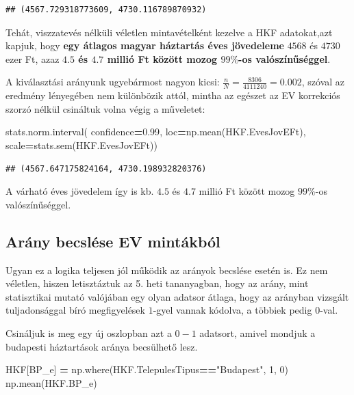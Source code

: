 \documentclass[
]{book}
\newenvironment{Shaded}{\begin{snugshade}}{\end{snugshade}}
\newcommand{\DecValTok}[1]{\textcolor[rgb]{0.00,0.00,0.81}{#1}}
\newcommand{\FloatTok}[1]{\textcolor[rgb]{0.00,0.00,0.81}{#1}}
\newcommand{\NormalTok}[1]{#1}
\newcommand{\OperatorTok}[1]{\textcolor[rgb]{0.81,0.36,0.00}{\textbf{#1}}}
\newcommand{\StringTok}[1]{\textcolor[rgb]{0.31,0.60,0.02}{#1}}
\begin{document}
\begin{verbatim}
## (4567.729318773609, 4730.116789870932)
\end{verbatim}

Tehát, viszzatevés nélküli véletlen mintavételként kezelve a HKF adatokat,azt kapjuk, hogy \textbf{egy átlagos magyar háztartás éves jövedeleme} \(4568\) és \(4730\) ezer Ft, azaz \textbf{\(4.5\) és \(4.7\) millió Ft között mozog \(99\%\)-os valószínűséggel}.

A kiválasztási arányunk ugyebármost nagyon kicsi: \(\frac{n}{N}=\frac{8306}{4111240}=0.002\), szóval az eredmény lényegében nem különbözik attól, mintha az egészet az EV korrekciós szorzó nélkül csináltuk volna végig a műveletet:

\begin{Shaded}
\begin{Highlighting}[]
\NormalTok{stats.norm.interval(}
\NormalTok{  confidence}\OperatorTok{=}\FloatTok{0.99}\NormalTok{,}
\NormalTok{  loc}\OperatorTok{=}\NormalTok{np.mean(HKF.EvesJovEFt),}
\NormalTok{  scale}\OperatorTok{=}\NormalTok{stats.sem(HKF.EvesJovEFt))}
\end{Highlighting}
\end{Shaded}

\begin{verbatim}
## (4567.647175824164, 4730.198932820376)
\end{verbatim}

A várható éves jövedelem így is kb. \(4.5\) és \(4.7\) millió Ft között mozog \(99\%\)-os valószínűséggel.

\subsection{Arány becslése EV mintákból}\label{aruxe1ny-becsluxe9se-ev-mintuxe1kbuxf3l}

Ugyan ez a logika teljesen jól működik az arányok becslése esetén is. Ez nem véletlen, hiszen letisztáztuk az 5. heti tananyagban, hogy az arány, mint statisztikai mutató valójában egy olyan adatsor átlaga, hogy az arányban vizsgált tuljadonsággal bíró megfigyelések \(1\)-gyel vannak kódolva, a többiek pedig \(0\)-val.

Csináljuk is meg egy új oszlopban azt a \(0-1\) adatsort, amivel mondjuk a budapesti háztartások aránya becsülhető lesz.

\begin{Shaded}
\begin{Highlighting}[]
\NormalTok{HKF[}\StringTok{\textquotesingle{}BP\_e\textquotesingle{}}\NormalTok{] }\OperatorTok{=}\NormalTok{ np.where(HKF.TelepulesTipus}\OperatorTok{==}\StringTok{"Budapest"}\NormalTok{, }\DecValTok{1}\NormalTok{, }\DecValTok{0}\NormalTok{)}
\NormalTok{np.mean(HKF.BP\_e)}
\end{Highlighting}
\end{Shaded}
\end{document}
